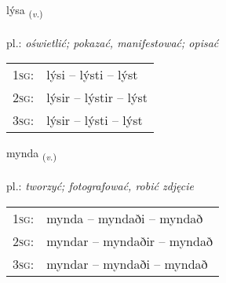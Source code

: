 \documentclass[frontgrid, backgrid]{flacards}\usepackage[]{graphicx}\usepackage[]{xcolor}
\begin{document}
\renewcommand{\flhead}{\vskip5pt \fboxsep=0pt {\small\bfseries\footnotesize Sagnorð | czasownik}}
\renewcommand{\fcfoot}{\vskip5pt \fboxsep=0pt \hspace{2pt}{\small\bfseries\footnotesize 1K}}

\renewcommand{\blhead}{\vskip5pt {\small\bfseries\footnotesize Sagnorð | czasownik }}
\renewcommand{\bcfoot}{\vskip5pt \hspace{2pt}{\small\bfseries\footnotesize 1K}}


{lýsa \small{\textsubscript{(\textit{v.})}} \\[1ex] %
\textphonetic{[liːsa]} \\
pl.: \emph{oświetlić; pokazać, manifestować; opisać} \\  [2ex]
\renewcommand*{\arraystretch}{0.8}
\begin{tabular}{p{1cm}l}
\textsc{1sg}: & lýsi -- lýsti -- lýst \\ 
\textsc{2sg}: & lýsir -- lýstir -- lýst \\ 
\textsc{3sg}: & lýsir -- lýsti -- lýst \\ 
\end{tabular}
}

\renewcommand{\flhead}{\vskip5pt \fboxsep=0pt {\small\bfseries\footnotesize Sagnorð | czasownik}}
\renewcommand{\fcfoot}{\vskip5pt \fboxsep=0pt \hspace{2pt}{\small\bfseries\footnotesize 1K}}

\renewcommand{\blhead}{\vskip5pt {\small\bfseries\footnotesize Sagnorð | czasownik }}
\renewcommand{\bcfoot}{\vskip5pt \hspace{2pt}{\small\bfseries\footnotesize 1K}}


{mynda \small{\textsubscript{(\textit{v.})}} \\[1ex] %
\textphonetic{[mɪnta]} \\
pl.: \emph{tworzyć; fotografować, robić zdjęcie} \\  [2ex]
\renewcommand*{\arraystretch}{0.8}
\begin{tabular}{p{1cm}l}
\textsc{1sg}: & mynda -- myndaði -- myndað \\ 
\textsc{2sg}: & myndar -- myndaðir -- myndað \\ 
\textsc{3sg}: & myndar -- myndaði -- myndað \\ 
\end{tabular}
}
\end{document}
